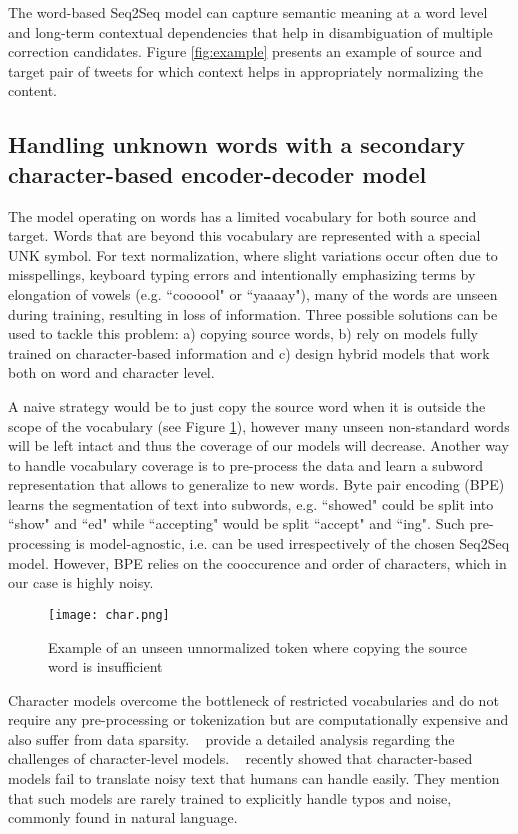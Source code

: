 \documentclass[letterpaper]{article} \usepackage{aaai19}  \usepackage{times}  \usepackage{helvet} \usepackage{courier}  \usepackage[hyphens]{url}  \usepackage{graphicx} \urlstyle{rm} \def\UrlFont{\rm}  \usepackage{graphicx}  \frenchspacing  \setlength{\pdfpagewidth}{8.5in}  \setlength{\pdfpageheight}{11in}
\newcommand{\citet}[1]{\citeauthor{#1}~\shortcite{#1}}
\newcommand{\citep}{\cite}
\begin{document}
The word-based Seq2Seq model can capture semantic meaning at a word level and long-term contextual dependencies that help in disambiguation of multiple correction candidates. Figure \ref{fig:example} presents an example of source and target pair of tweets for which context helps in appropriately normalizing the content.


\subsection{Handling unknown words with a secondary character-based encoder-decoder model}

The model operating on words has a limited vocabulary for both source and target. Words that are beyond this vocabulary are represented with a special UNK symbol. For text normalization, where slight variations occur often due to misspellings, keyboard typing errors and intentionally emphasizing terms by elongation of vowels (e.g. ``coooool" or ``yaaaay"), many of the words are unseen during training, resulting in loss of information. Three possible solutions can be used to tackle this problem: a) copying source words, b) rely on models fully trained on character-based information and c) design hybrid models that work both on word and character level.

A naive strategy would be to just copy the source word when it is outside the scope of the vocabulary (see Figure \ref{fig:char}), however many unseen non-standard words will be left intact and thus the coverage of our models will decrease. Another way to handle vocabulary coverage is to pre-process the data and learn a subword representation that allows to generalize to new words. Byte pair encoding (BPE) \citep{sennrich2015neural} learns the segmentation of text into subwords, e.g. ``showed" could be split into ``show" and ``ed" while ``accepting" would be split ``accept" and ``ing". Such pre-processing is model-agnostic, i.e. can be used irrespectively of the chosen Seq2Seq model. However, BPE relies on the cooccurence and order of characters, which in our case is highly noisy. 

\begin{figure}[h]
    \centering
    \texttt{[image: char.png]}
    \caption{Example of an unseen unnormalized token where copying the source word is insufficient}
    \label{fig:char}
\end{figure}

Character models overcome the bottleneck of restricted vocabularies and do not require any pre-processing or tokenization but are computationally expensive and also suffer from data sparsity. \citet{chung2016character} provide a detailed analysis regarding the challenges of character-level models. \citet{belinkov2017synthetic} recently showed that character-based models fail to translate noisy text that humans can handle easily. They mention that such models are rarely trained to explicitly handle typos and noise, commonly found in natural language. 
\end{document}
